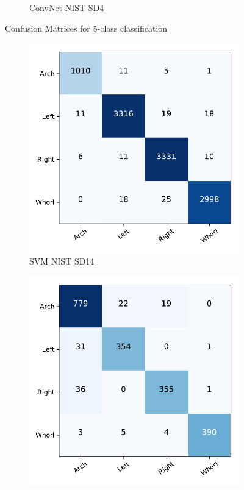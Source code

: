 \begin{figure}[!ht]
\begin{subfigure}[b]{0.25\textwidth}
		\caption{ConvNet NIST SD4 }
		\label{fig.cnf_matrix_5class.net_sd4}
	\end{subfigure}
	\caption{Confusion Matrices for 5-class classification}\label{fig.cnf_matrix_5class}
\end{figure}

\begin{figure}[!ht]
	\begin{subfigure}[b]{0.25\textwidth}
		\centering
		\includegraphics[width=\linewidth]{fig/figs/confusion_matrix_svm_sd14_4class.pdf}
		\caption{SVM NIST SD14 }
		\label{fig.cnf_matrix_4class.svm_sd14}
	\end{subfigure}%
	\begin{subfigure}[b]{0.25\textwidth}
		\centering
		\includegraphics[width=\linewidth]{fig/figs/confusion_matrix_svm_sd4_4class_cross_subject.pdf}

\end{subfigure}
\end{figure}
